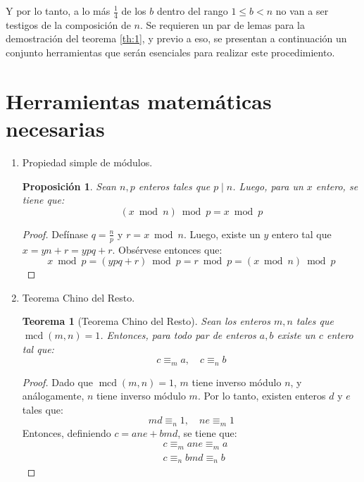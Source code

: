 \documentclass[hidelinks, 12pt]{article}
\DeclareMathOperator{\mcd}{mcd}
\newtheorem{theorem}{Teorema}
\newtheorem*{proposition}{Proposición}
\begin{document}
Y por lo tanto, a lo más $\frac{1}{4}$ de los $b$ dentro del rango $1\leq b<n$ no van a ser testigos de la composición de $n$. Se requieren un par de lemas para la demostración del teorema \ref{th:1}, y previo a eso, se presentan a continuación un conjunto herramientas que serán esenciales para realizar este procedimiento.

\newpage
\section{Herramientas matemáticas necesarias}
\begin{enumerate}
    \item Propiedad simple de módulos. \\
    \begin{proposition}
        Sean $n,p$ enteros tales que $p\mid n$. Luego, para un $x$ entero, se tiene que: \[(x\bmod n)\bmod p=x\bmod p\]
    \end{proposition}
    \begin{proof}
        Defínase $q=\frac{n}{p}$ y $r=x\bmod n$. Luego, existe un $y$ entero tal que $x=yn+r=ypq+r$. Obsérvese entonces que:
        \[x\bmod p=(ypq+r)\bmod p=r\bmod p=(x\bmod n)\bmod p\]
    \end{proof}
    
    \item Teorema Chino del Resto. \\
    \begin{theorem}[Teorema Chino del Resto]
        Sean los enteros $m,n$ tales que $\mcd(m,n)=1$. Entonces, para todo par de enteros $a,b$ existe un $c$ entero tal que: 
        \[c\equiv_m a,\quad c\equiv_n b\]
    \end{theorem}
    \begin{proof}
        Dado que $\mcd(m,n)=1$, $m$ tiene inverso módulo $n$, y análogamente, $n$ tiene inverso módulo $m$. Por lo tanto, existen enteros $d$ y $e$ tales que:
        \[md\equiv_n 1,\quad ne\equiv_m 1\]
        Entonces, definiendo $c=ane+bmd$, se tiene que:
        \begin{align*}
            &c\equiv_m ane\equiv_m a\\
            &c\equiv_n bmd\equiv_n b
        \end{align*}
    \end{proof}
    

\end{enumerate}
\end{document}
